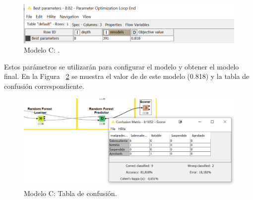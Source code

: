 \begin{figure}[!htb]
	\centering
	\includegraphics[width=1\textwidth]{img/workflowC2.png}
	\caption{Modelo C: .}
	\label{fig:workflowC2}
\end{figure}
\FloatBarrier

Estos parámetros se utilizarán para configurar el modelo y obtener el modelo final. En la Figura ~\ref{fig:workflowC3} se muestra
el valor de  de este modelo (0.818) y la tabla de confusión correspondiente. 

\begin{figure}[!htb]
	\centering
	\includegraphics[width=1\textwidth]{img/workflowC3.png}
	\caption{Modelo C: Tabla de confusión.}
	\label{fig:workflowC3}
\end{figure}
\FloatBarrier

